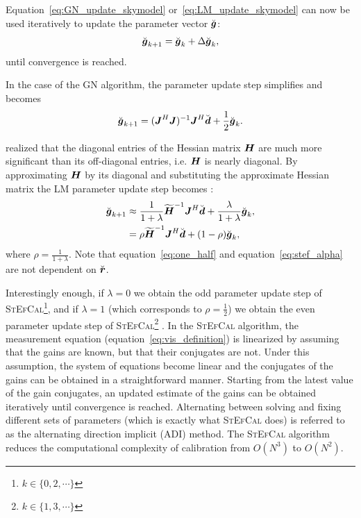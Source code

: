 \documentclass[useAMS,usenatbib]{mn2e}
\newcommand{\br}{\bmath{r}}
\newcommand{\bg}{\bmath{g}}
\newcommand{\bd}{\bmath{d}}
\newcommand{\bJ}{\bmath{J}}
\newcommand{\bH}{\bmath{H}}
\begin{document}
Equation~\ref{eq:GN_update_skymodel} or~\ref{eq:LM_update_skymodel} can now be used iteratively to update the parameter vector $\breve{\bg}$:
\begin{equation}
\label{eq:update_skymodel}
\breve{\bg}_{k+1} = \breve{\bg}_{k} + \Delta \breve{\bg}_{k},
\end{equation}
until convergence is reached.

In the case of the GN algorithm, the parameter update step simplifies and becomes \citep{Smirnov2015}
\begin{equation}
\label{eq:one_half}
\breve{\bg}_{k+1} = (\bJ^H\bJ)^{-1}\bJ^H\breve{\bd} + \frac{1}{2}\breve{\bg}_{k}. 
\end{equation}


\citet{Smirnov2015} realized that the diagonal entries of the Hessian matrix $\bH$ are much more significant than its off-diagonal entries, i.e. $\bH$ is nearly diagonal. By approximating $\bH$ by its diagonal and substituting the approximate Hessian matrix the LM parameter update step becomes \citep{Smirnov2015}:
\begin{align}
\breve{\bg}_{k+1} &\approx \frac{1}{1+\lambda}\widetilde{\bH}^{-1}\bJ^H\breve{\bd} + \frac{\lambda}{1+\lambda} \breve{\bg}_k, \nonumber \\
 &= \rho \widetilde{\bH}^{-1}\bJ^H\breve{\bd} + (1-\rho)\breve{\bg}_k, 
\label{eq:stef_alpha}  
\end{align}
where $\rho = \frac{1}{1+\lambda}$. Note that equation~\ref{eq:one_half} and equation~\ref{eq:stef_alpha} are   
not dependent on $\breve{\br}$. 

Interestingly enough, if $\lambda = 0$ we obtain the odd parameter update step of \textsc{StEfCal}\footnote{$k\in\{0,2,\cdots\}$}, and if $\lambda=1$ (which corresponds
to $\rho=\frac{1}{2}$) we obtain the even parameter update step of \textsc{StEfCal}\footnote{$k\in\{1,3,\cdots\}$} \citep[\textsc{StEfCal},][]{Mitchell:MWA-cal,Salvini2014}. In the \textsc{StEfCal} algorithm, the measurement equation (equation~\ref{eq:vis_definition}) is linearized by assuming that the gains are known, but that their conjugates are not. Under this assumption, the system of equations become linear and the conjugates of the gains can be obtained in a straightforward manner. Starting from the latest value of the gain conjugates, an updated estimate of the gains can be obtained iteratively until convergence is reached.
Alternating between solving and fixing different sets of parameters (which is exactly what \textsc{StEfCal} does) is referred to 
as the alternating direction implicit (ADI) method. The \textsc{StEfCal} algorithm reduces the computational complexity of calibration from $O(N^3)$ to $O(N^2)$.
\end{document}
